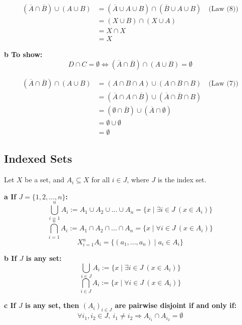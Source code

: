 \begin{align*}
	(\overline{A} \cap \overline{B}) \cup (A \cup B)
	 & = (\overline{A} \cup A \cup B) \cap (\overline{B} \cup A \cup B) \quad \text{(Law (8))} \\
	 & = (X \cup B) \cap (X \cup A)                                                            \\
	 & = X \cap X                                                                              \\
	 & = X
\end{align*}

\textbf{b To show:}
\[
	D \cap C = \emptyset \iff (\overline{A} \cap \overline{B}) \cap (A \cup B) = \emptyset
\]

\begin{align*}
	(\overline{A} \cap \overline{B}) \cap (A \cup B)
	 & = (A \cap B \cap A) \cup (A \cap B \cap B) \quad \text{(Law (7))}                      \\
	 & = (\overline{A} \cap A \cap \overline{B}) \cup (\overline{A} \cap \overline{B} \cap B) \\
	 & = (\emptyset \cap \overline{B}) \cup (\overline{A} \cap \emptyset)                     \\
	 & = \emptyset \cup \emptyset                                                             \\
	 & = \emptyset
\end{align*}

\subsection{Indexed Sets}
Let \( X \) be a set, and \( A_i \subseteq X \) for all \( i \in J \), where \( J \) is the index set.

\textbf{a If \( J = \{1, 2, \dots, n\} \):}
\[
	\bigcup_{i=1}^{n} A_i := A_1 \cup A_2 \cup \dots \cup A_n = \{ x \mid \exists i \in J \ (x \in A_i) \}
\]
\[
	\bigcap_{i=1}^{n} A_i := A_1 \cap A_2 \cap \dots \cap A_n = \{ x \mid \forall i \in J \ (x \in A_i) \}
\]
\[
	X_{i=1}^{n} A_i = \{(a_1, \dots, a_n) \mid a_i \in A_i \}
\]

\textbf{b If \( J \) is any set:}
\[
	\bigcup_{i \in J} A_i := \{ x \mid \exists i \in J \ (x \in A_i) \}
\]
\[
	\bigcap_{i \in J} A_i := \{ x \mid \forall i \in J \ (x \in A_i) \}
\]

\textbf{c If \( J \) is any set, then \( (A_i)_{i \in J} \) are pairwise disjoint if and only if:}
\[
	\forall i_1, i_2 \in J, \ i_1 \neq i_2 \Rightarrow A_{i_1} \cap A_{i_2} = \emptyset
\]

